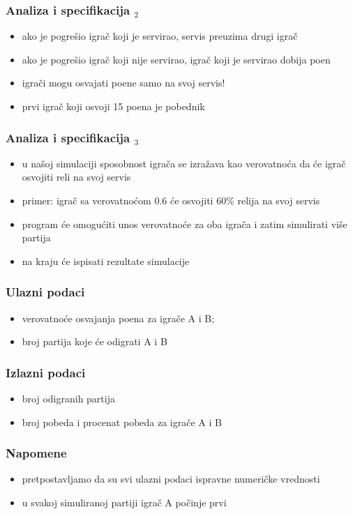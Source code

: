 \documentclass[utf8,compress,aspectratio=169]{beamer}
\begin{document}
\begin{frame}
  \frametitle{Analiza i specifikacija $_2$}
  \begin{itemize}
    \item ako je pogrešio igrač koji je servirao, servis preuzima drugi igrač
    \item ako je pogrešio igrač koji nije servirao, igrač koji je servirao dobija poen
    \item igrači mogu osvajati poene samo na svoj servis!
    \item prvi igrač koji osvoji 15 poena je pobednik
  \end{itemize}
\end{frame}

\begin{frame}
  \frametitle{Analiza i specifikacija $_3$}
  \begin{itemize}
    \item u našoj simulaciji sposobnost igrača se izražava kao verovatnoća da će igrač osvojiti reli na svoj servis
    \item primer: igrač sa verovatnoćom 0.6 će osvojiti 60\% relija na svoj servis
    \item program će omogućiti unos verovatnoće za oba igrača i zatim simulirati više partija
    \item na kraju će ispisati rezultate simulacije
  \end{itemize}
\end{frame}

\begin{frame}
  \frametitle{Ulazni podaci}
  \begin{itemize}
    \item verovatnoće osvajanja poena za igrače A i B;
    \item broj partija koje će odigrati A i B
  \end{itemize}
\end{frame}

\begin{frame}
  \frametitle{Izlazni podaci}
  \begin{itemize}
    \item broj odigranih partija
    \item broj pobeda i procenat pobeda za igrače A i B
  \end{itemize}
\end{frame}

\begin{frame}
  \frametitle{Napomene}
  \begin{itemize}
    \item pretpostavljamo da su svi ulazni podaci ispravne numeričke vrednosti
    \item u svakoj simuliranoj partiji igrač A počinje prvi
  \end{itemize}
\end{frame}
\end{document}
